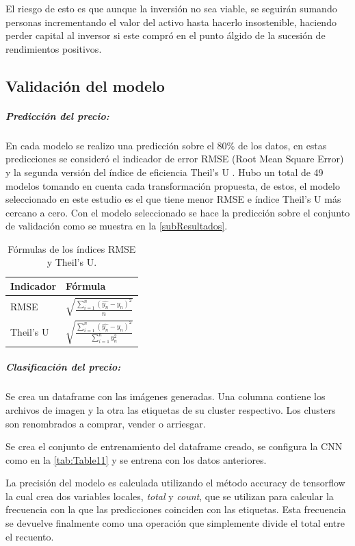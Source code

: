 El riesgo de esto es que aunque la inversión no sea viable, se seguirán sumando personas incrementando el valor del activo hasta hacerlo insostenible, haciendo perder capital al inversor si este compró en el punto álgido de la sucesión de rendimientos positivos.

\subsection{Validación del modelo}
\subparagraph{Predicción del precio:}
En cada modelo se realizo una predicción sobre el 80\% de los datos, en estas predicciones se consideró el indicador de error RMSE (Root Mean Square Error) y la segunda versión del índice de eficiencia Theil’s U \parencite{bliemelTheilForecastAccuracy1973}.
Hubo un total de 49 modelos tomando en cuenta cada transformación propuesta, de estos, el modelo seleccionado en este estudio es el que tiene menor RMSE e índice Theil’s U más cercano a cero. Con el modelo seleccionado se hace la predicción sobre el conjunto de validación como se muestra en la \cref{subResultados}.

\begin{table}[H]
	\centering
	{
		\begin{tabular}{ll}
			\toprule
			\textbf{Indicador} & \textbf{Fórmula}\\
			\midrule
			RMSE			&$\sqrt{\frac{\sum_{i=1}^{n}({\hat{y_{n}}} - y_{n})^{2}}{n}}$\\ 
			Theil’s U 	&$\sqrt{\frac{\sum_{i=1}^{n}({\hat{y_{n}}} - y_{n})^{2}}{\sum_{i=1}^{n}y_{n}^{2}}}$ \\
			
			\bottomrule
			\hline
	\end{tabular}} \quad
	\caption{Fórmulas de los índices RMSE y Theil’s U.}
	\label{tab:Table12}
\end{table}

\subparagraph{Clasificación del precio:}
Se crea un dataframe con las imágenes generadas. Una columna contiene los archivos de imagen y la otra las etiquetas de su cluster respectivo. Los clusters son renombrados a comprar, vender o arriesgar.

Se crea el conjunto de entrenamiento del dataframe creado, se configura la CNN como en la \cref{tab:Table11} y se entrena con los datos anteriores.

La precisión del modelo es calculada utilizando el método accuracy de tensorflow la cual crea dos variables locales, \emph{total} y \emph{count}, que se utilizan para calcular la frecuencia con la que las predicciones coinciden con las etiquetas. Esta frecuencia se devuelve finalmente como una operación que simplemente divide el total entre el recuento.





